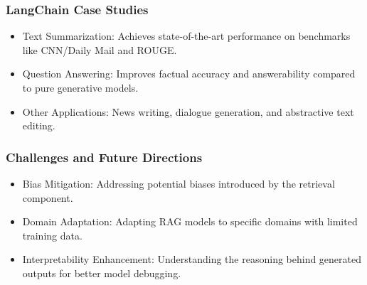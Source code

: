 \begin{frame}[fragile]\frametitle{LangChain Case Studies}

\begin{itemize}
\item Text Summarization: Achieves state-of-the-art performance on benchmarks like CNN/Daily Mail and ROUGE.
\item Question Answering: Improves factual accuracy and answerability compared to pure generative models.
\item Other Applications: News writing, dialogue generation, and abstractive text editing.
\end{itemize}	

\end{frame}


\begin{frame}[fragile]\frametitle{Challenges and Future Directions}

\begin{itemize}
\item Bias Mitigation: Addressing potential biases introduced by the retrieval component.
\item Domain Adaptation: Adapting RAG models to specific domains with limited training data.
\item Interpretability Enhancement: Understanding the reasoning behind generated outputs for better model debugging.
\end{itemize}	

\end{frame}